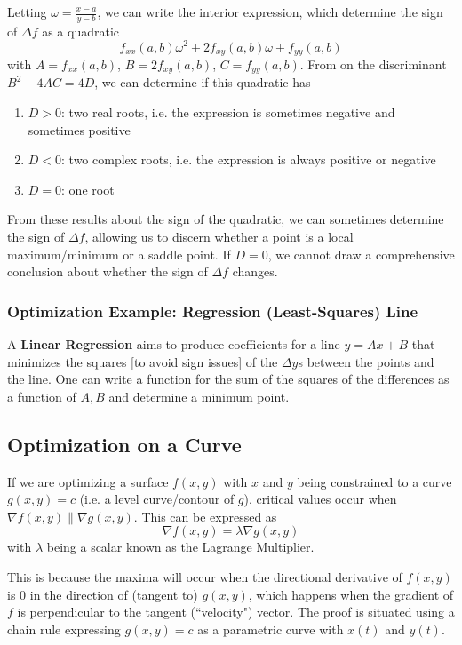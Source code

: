 \documentclass{article}
\begin{document}
Letting $\omega = \frac{x-a}{y-b}$, we can write the interior expression, which determine the sign of $\Delta{f}$ as a quadratic
\[
f_{xx}(a,b)\omega^2+2f_{xy}(a,b)\omega+f_{yy}(a,b)
\] with $A = f_{xx}(a,b)$, $B=2f_{xy}(a,b)$, $C=f_{yy}(a,b)$. From on the discriminant $B^2-4AC=4D$, we can determine if this quadratic has
\begin{enumerate}
    \item $D > 0$: two real roots, i.e. the expression is sometimes negative and sometimes positive
    \item $D < 0$: two complex roots, i.e. the expression is always positive or negative
    \item $D = 0$: one root
\end{enumerate}
From these results about the sign of the quadratic, we can sometimes determine the sign of $\Delta{f}$, allowing us to discern whether a point is a local maximum/minimum or a saddle point. If $D=0$, we cannot draw a comprehensive conclusion about whether the sign of $\Delta{f}$ changes.

\subsubsection{Optimization Example: Regression (Least-Squares) Line} A \textbf{Linear Regression} aims to produce coefficients for a line $y=Ax+B$ that minimizes the squares [to avoid sign issues] of the $\Delta{y}$s between the points and the line. One can write a function for the sum of the squares of the differences as a function of $A,B$ and determine a minimum point.

\subsection{Optimization on a Curve}
If we are optimizing a surface $f(x,y)$ with $x$ and $y$ being constrained to a curve $g(x,y)=c$ (i.e. a level curve/contour of $g$), critical values occur when $\nabla f(x,y) \parallel \nabla g(x,y)$. This can be expressed as
$$\nabla f(x,y) = \lambda\nabla g(x,y)$$ with $\lambda$ being a scalar known as the Lagrange Multiplier.

This is because the maxima will occur when the directional derivative of $f(x,y)$ is $0$ in the direction of (tangent to) $g(x,y)$, which happens when the gradient of $f$ is perpendicular to the tangent (``velocity") vector. The proof is situated using a chain rule expressing $g(x,y)=c$ as a parametric curve with $x(t)$ and $y(t)$.
\end{document}
